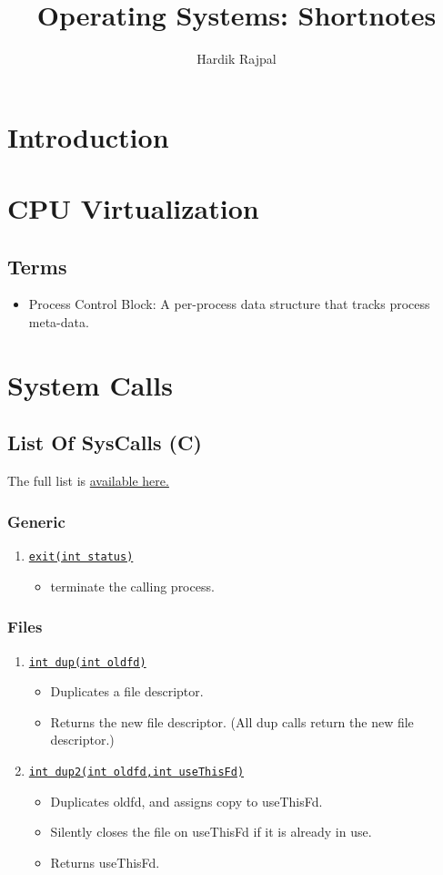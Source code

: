 \documentclass[10pt]{report}
\title{Operating Systems: Shortnotes}
\author{Hardik Rajpal}
\newcommand{\syscalldoc}[3]{
    \item \href{#2}{\texttt{#1}}
    \begin{itemize}
        #3
    \end{itemize}
}
\begin{document}
\maketitle
\tableofcontents
\pagebreak
\chapter{Introduction}
\chapter{CPU Virtualization}
\section*{Terms}
\begin{itemize}
\item Process Control Block: A per-process data structure that tracks process meta-data.
\end{itemize}
\chapter{System Calls}
\section{List Of SysCalls (C)}
The full list is \href{https://www.cheat-sheets.org/saved-copy/Linux_Syscall_quickref.pdf}{available here.}
\subsection{Generic}
\begin{enumerate}
\syscalldoc{exit(int status)}
{https://man7.org/linux/man-pages/man3/exit.3.html}{
\item terminate the calling process.
}

\end{enumerate}
\subsection{Files}
\begin{enumerate}
\syscalldoc{int dup(int oldfd)}{https://man7.org/linux/man-pages/man2/dup.2.html}{
\item Duplicates a file descriptor.
\item Returns the new file descriptor. (All dup calls return the new file descriptor.)
}
\syscalldoc{int dup2(int oldfd,int useThisFd)}{
https://man7.org/linux/man-pages/man2/dup.2.html
}{
\item Duplicates oldfd, and assigns copy to useThisFd.
\item Silently closes the file on useThisFd if it is already in use.
\item Returns useThisFd.
}
\end{enumerate}
\end{document}

